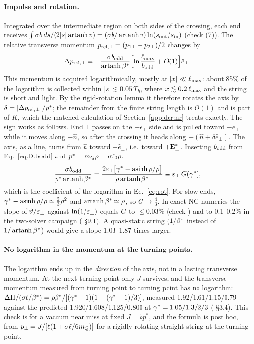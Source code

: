 \paragraph{Impulse and rotation.} Integrated over the intermediate region on both sides of the crossing, each end
receives $\int\sigma b\,ds/(2|s|\operatorname{artanh}v)=(\sigma b/\operatorname{artanh}v)\ln(s_{\rm out}/s_{\rm in})$
(check  (7)). The relative transverse momentum $p_{{\rm rel},\perp}=(p_{1\perp}-p_{2\perp})/2$ changes by
\begin{equation}
  \Delta p_{{\rm rel},\perp}=-\frac{\sigma b_{\rm odd}}{\operatorname{artanh}\beta^*}\Bigl[\ln\frac{\ell_{\max}}{b_{\rm odd}}+O(1)\Bigr]\hat e_\perp .
  \label{eq:D:dprel}
\end{equation}
This momentum is acquired logarithmically, mostly at $|x|\ll\ell_{\max}$: about 85\% of the logarithm is collected within
$|s|\lesssim0.05\,T_h$, where $x\lesssim0.2\,\ell_{\max}$ and the string is short and light. By the rigid-rotation lemma it
therefore rotates the axis by $\delta=|\Delta p_{{\rm rel},\perp}|/p^*$; the remainder from the finite string length is
$O(1)$ and is part of $K$, which the matched calculation of Section~\ref{app:der:nr} treats exactly. The sign works as
follows. End~1 passes on the $+\hat e_\perp$ side and is pulled toward $-\hat e_\perp$ while it moves along $-\hat n$, so
after the crossing it heads along $-(\hat n+\delta\hat e_\perp)$. The axis, as a line, turns from $\hat n$ toward
$+\hat e_\perp$, i.e.\ toward $+\mathbf{E}^*_\perp$. Inserting $b_{\rm odd}$ from Eq.~\eqref{eq:D:bodd} and $p^*=m_Q\rho=\sigma\ell_0\rho$:
\begin{equation}
  \frac{\sigma b_{\rm odd}}{p^*\operatorname{artanh}\beta^*}
  =\frac{2\varepsilon_\perp\bigl[\gamma^*-\operatorname{asinh}\rho/\rho\bigr]}{\rho\operatorname{artanh}\beta^*}
  \equiv\varepsilon_\perp\,G(\gamma^*),
  \label{eq:D:G}
\end{equation}
which is the coefficient of the logarithm in Eq.~\eqref{eq:rot}. For slow ends, $\gamma^*-\operatorname{asinh}\rho/\rho\simeq\tfrac23\rho^2$ and $\operatorname{artanh}\beta^*\simeq\rho$, so $G\to\tfrac43$. In
exact-NG numerics the slope of $\vartheta/\varepsilon_\perp$ against $\ln(1/\varepsilon_\perp)$ equals $G$ to $\le0.03\%$ (check ) and
to 0.1--0.2\% in the two-solver campaign ( \S9.1). A quasi-static string ($1/\beta^*$ instead of
$1/\operatorname{artanh}\beta^*$) would give a slope 1.03--1.87 times larger.

\paragraph{No logarithm in the momentum at the turning points.} The logarithm ends up in the \emph{direction} of the
axis, not in a lasting transverse momentum. At the next turning point only $J$ survives, and the transverse momentum
measured from turning point to turning point has no logarithm: $\Delta\Pi/(\sigma b/\beta^*)=\rho\beta^*/[(\gamma^*-1)(1+(\gamma^*-1)/3)]$,
measured 1.92/1.61/1.15/0.79 against the predicted 1.920/1.608/1.125/0.800 at $\gamma^*=1.05/1.3/2/3$ ( \S3.4).
This check is for a vacuum near miss at fixed $J=bp^*$, and the formula is post hoc, from
$p_\perp=J/[\ell(1+\sigma\ell/6m_Q)]$ for a rigidly rotating straight string at the turning point.

